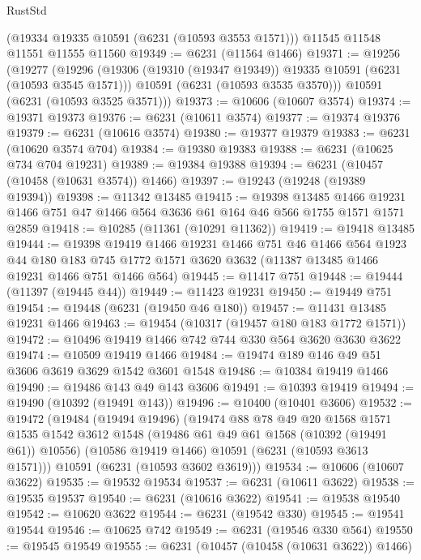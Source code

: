 \begin{lexlean}{RustStd}
\begin{coremodule}
{{    (@19334 @19335 @10591 (@6231 (@10593 @3553 @1571)))
    @11545
    @11548
    @11551
    @11555
    @11560
@19349 := @6231 (@11564 @1466)
@19371 := @19256
    (@19277
      (@19296
        (@19306 (@19310 (@19347 @19349)) @19335 @10591 (@6231 (@10593 @3545 @1571)))
        @10591
        (@6231 (@10593 @3535 @3570)))
      @10591
      (@6231 (@10593 @3525 @3571)))
@19373 := @10606 (@10607 @3574)
@19374 := @19371 @19373
@19376 := @6231 (@10611 @3574)
@19377 := @19374 @19376
@19379 := @6231 (@10616 @3574)
@19380 := @19377 @19379
@19383 := @6231 (@10620 @3574 @704)
@19384 := @19380 @19383
@19388 := @6231 (@10625 @734 @704 @19231)
@19389 := @19384 @19388
@19394 := @6231 (@10457 (@10458 (@10631 @3574)) @1466)
@19397 := @19243 (@19248 (@19389 @19394))
@19398 := @11342 @13485
@19415 := @19398
    @13485
    @1466
    @19231
    @1466
    @751
    @47
    @1466
    @564
    @3636
    @61
    @164
    @46
    @566
    @1755
    @1571
    @1571
    @2859
@19418 := @10285 (@11361 (@10291 @11362))
@19419 := @19418 @13485
@19444 := @19398
    @19419
    @1466
    @19231
    @1466
    @751
    @46
    @1466
    @564
    @1923
    @44
    @180
    @183
    @745
    @1772
    @1571
    @3620
    @3632
    (@11387 @13485 @1466 @19231 @1466 @751 @1466 @564)
@19445 := @11417 @751
@19448 := @19444 (@11397 (@19445 @44))
@19449 := @11423 @19231
@19450 := @19449 @751
@19454 := @19448 (@6231 (@19450 @46 @180))
@19457 := @11431 @13485 @19231 @1466
@19463 := @19454 (@10317 (@19457 @180 @183 @1772 @1571))
@19472 := @10496 @19419 @1466 @742 @744 @330 @564 @3620 @3630 @3622
@19474 := @10509 @19419 @1466
@19484 := @19474 @189 @146 @49 @51 @3606 @3619 @3629 @1542 @3601 @1548
@19486 := @10384 @19419 @1466
@19490 := @19486 @143 @49 @143 @3606
@19491 := @10393 @19419
@19494 := @19490 (@10392 (@19491 @143))
@19496 := @10400 (@10401 @3606)
@19532 := @19472
    (@19484
      (@19494 @19496)
      (@19474
        @88
        @78
        @49
        @20
        @1568
        @1571
        @1535
        @1542
        @3612
        @1548
        (@19486 @61 @49 @61 @1568 (@10392 (@19491 @61)) @10556)
        (@10586 @19419 @1466)
        @10591
        (@6231 (@10593 @3613 @1571)))
      @10591
      (@6231 (@10593 @3602 @3619)))
@19534 := @10606 (@10607 @3622)
@19535 := @19532 @19534
@19537 := @6231 (@10611 @3622)
@19538 := @19535 @19537
@19540 := @6231 (@10616 @3622)
@19541 := @19538 @19540
@19542 := @10620 @3622
@19544 := @6231 (@19542 @330)
@19545 := @19541 @19544
@19546 := @10625 @742
@19549 := @6231 (@19546 @330 @564)
@19550 := @19545 @19549
@19555 := @6231 (@10457 (@10458 (@10631 @3622)) @1466)
}}
\end{coremodule}
\end{lexlean}
